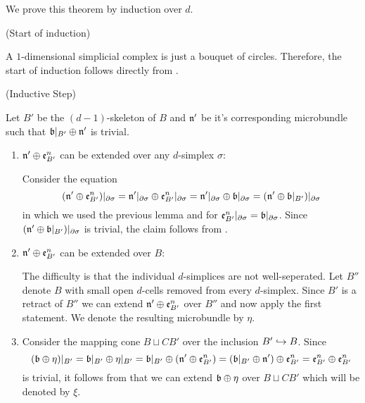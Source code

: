 \begin{myproof}
    We prove this theorem by induction over $d$.

    (Start of induction)

    A $1$-dimensional simplicial complex is just a bouquet of circles.
    Therefore, the start of induction follows directly from .   

    (Inductive Step)

    Let $B'$ be the $(d - 1)$-skeleton of $B$ and $\mathfrak{n}'$ be it's corresponding microbundle
    such that $\mathfrak{b}\vert_{B'} \oplus \mathfrak{n}'$ is trivial.

    \begin{enumerate}
        \item $\mathfrak{n}' \oplus \mathfrak{e}^{n}_{B'}$ can be extended over any $d$-simplex $\sigma$:

        Consider the equation
        \[
            (\mathfrak{n}' \oplus \mathfrak{e}^{n}_{B'})\vert_{\partial\sigma}
            = \mathfrak{n}'\vert_{\partial\sigma} \oplus \mathfrak{e}^{n}_{B'}\vert_{\partial\sigma}
            = \mathfrak{n}'\vert_{\partial\sigma} \oplus \mathfrak{b}\vert_{\partial\sigma}
            = (\mathfrak{n}' \oplus \mathfrak{b}\vert_{B'})\vert_{\partial\sigma}
        \]
        in which we used the previous lemma and  for $\mathfrak{e}^{n}_{B'}\vert_{\partial\sigma} = \mathfrak{b}\vert_{\partial\sigma}$.
        Since $(\mathfrak{n}' \oplus \mathfrak{b}\vert_{B'})\vert_{\partial\sigma}$ is trivial, the claim follows from .

        \item $\mathfrak{n}' \oplus \mathfrak{e}^{n}_{B'}$ can be extended over $B$:

        The difficulty is that the individual $d$-simplices are not well-seperated.
        Let $B''$ denote $B$ with small open $d$-cells removed from every $d$-simplex.
        Since $B'$ is a retract of $B''$ we can extend $\mathfrak{n}' \oplus \mathfrak{e}^{n}_{B'}$ over $B''$ and now apply the first statement.
        We denote the resulting microbundle by $\eta$.

        \item
        Consider the mapping cone $B \sqcup CB'$ over the inclusion $B' \hookrightarrow{} B$.
        Since
        \[
            (\mathfrak{b} \oplus \eta)\vert_{B'}
            = \mathfrak{b}\vert_{B'} \oplus \eta\vert_{B'}
            = \mathfrak{b}\vert_{B'} \oplus (\mathfrak{n}' \oplus \mathfrak{e}^{n}_{B'})
            = (\mathfrak{b}\vert_{B'} \oplus \mathfrak{n}') \oplus \mathfrak{e}^{n}_{B'}
            = \mathfrak{e}^{n}_{B'} \oplus \mathfrak{e}^{n}_{B'}
        \]
        is trivial, it follows from  that we can extend $\mathfrak{b} \oplus \eta$ over $B \sqcup CB'$
        which will be denoted by $\xi$.


\end{enumerate}
\end{myproof}
